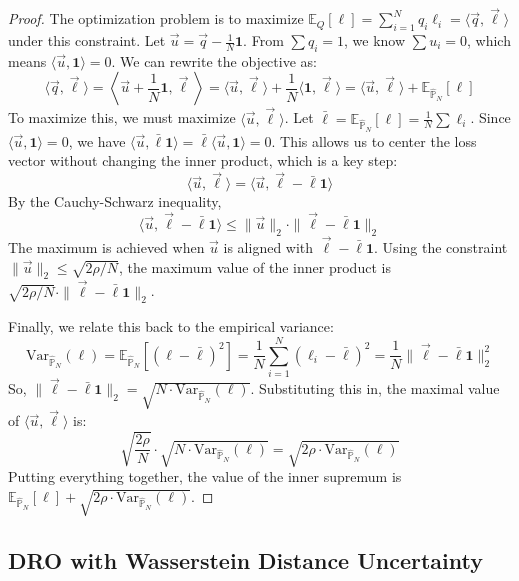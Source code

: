 \documentclass[12pt]{report}
\begin{document}
\begin{proof}
The optimization problem is to maximize $\mathbb{E}_Q[\ell] = \sum_{i=1}^N q_i \ell_i = \langle \vec{q}, \vec{\ell} \rangle$ under this constraint. 
Let $\vec{u} = \vec{q} - \frac{1}{N}\mathbf{1}$. From $\sum q_i = 1$, we know $\sum u_i = 0$, which means $\langle \vec{u}, \mathbf{1} \rangle = 0$. 
We can rewrite the objective as:
\[
\langle \vec{q}, \vec{\ell} \rangle = \left\langle \vec{u} + \frac{1}{N}\mathbf{1}, \vec{\ell} \right\rangle = \langle \vec{u}, \vec{\ell} \rangle + \frac{1}{N} \langle \mathbf{1}, \vec{\ell} \rangle = \langle \vec{u}, \vec{\ell} \rangle + \mathbb{E}_{\hat{\mathbb{P}}_N}[\ell]
\]
To maximize this, we must maximize $\langle \vec{u}, \vec{\ell} \rangle$. Let $\bar{\ell} = \mathbb{E}_{\hat{\mathbb{P}}_N}[\ell] = \frac{1}{N}\sum \ell_i$. Since $\langle \vec{u}, \mathbf{1} \rangle = 0$, we have $\langle \vec{u}, \bar{\ell}\mathbf{1} \rangle = \bar{\ell} \langle \vec{u}, \mathbf{1} \rangle = 0$. 
This allows us to center the loss vector without changing the inner product, which is a key step:
\[
\langle \vec{u}, \vec{\ell} \rangle = \langle \vec{u}, \vec{\ell} - \bar{\ell}\mathbf{1} \rangle
\]
By the Cauchy-Schwarz inequality,
\[
\langle \vec{u}, \vec{\ell} - \bar{\ell}\mathbf{1} \rangle \le \|\vec{u}\|_2 \cdot \|\vec{\ell} - \bar{\ell}\mathbf{1}\|_2
\]
The maximum is achieved when $\vec{u}$ is aligned with $\vec{\ell} - \bar{\ell}\mathbf{1}$. 
Using the constraint $\|\vec{u}\|_2 \le \sqrt{2\rho/N}$, the maximum value of the inner product is $\sqrt{2\rho/N} \cdot \|\vec{\ell} - \bar{\ell}\mathbf{1}\|_2$.

Finally, we relate this back to the empirical variance:
\[
\text{Var}_{\hat{\mathbb{P}}_N}(\ell) = \mathbb{E}_{\hat{\mathbb{P}}_N}[(\ell - \bar{\ell})^2] = \frac{1}{N}\sum_{i=1}^N(\ell_i - \bar{\ell})^2 = \frac{1}{N}\|\vec{\ell} - \bar{\ell}\mathbf{1}\|_2^2
\]
So, $\|\vec{\ell} - \bar{\ell}\mathbf{1}\|_2 = \sqrt{N \cdot \text{Var}_{\hat{\mathbb{P}}_N}(\ell)}$.
Substituting this in, the maximal value of $\langle \vec{u}, \vec{\ell} \rangle$ is:
\[
\sqrt{\frac{2\rho}{N}} \cdot \sqrt{N \cdot \text{Var}_{\hat{\mathbb{P}}_N}(\ell)} = \sqrt{2\rho \cdot \text{Var}_{\hat{\mathbb{P}}_N}(\ell)}
\]
Putting everything together, the value of the inner supremum is $\mathbb{E}_{\hat{\mathbb{P}}_N}[\ell] + \sqrt{2\rho \cdot \text{Var}_{\hat{\mathbb{P}}_N}(\ell)}$.
\end{proof}

\subsection{DRO with Wasserstein Distance Uncertainty}
\end{document}
